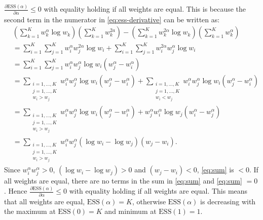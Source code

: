 \documentclass[a4paper]{article}
\DeclareMathOperator{\1}{{}\mathds{1}}
\begin{document}
$\frac{\partial \mathrm{ESS}(\alpha)}{\partial \alpha} \leq 0$ with equality holding if all weights are equal. 
This is because the second term in the numerator in \eqref{eq:ess-derivative} can be written as:
\begin{align}
    &\left(\sum_{k = 1}^K w_k^\alpha \log w_k \right) \left(\sum_{k = 1}^K w_k^{2a   } \right) - \left(\sum_{k = 1}^K w_k^{2 \alpha} \log w_k\right) \left(\sum_{k = 1}^K w_k^\alpha \right) \nonumber
    \\&= \sum_{i = 1}^K \sum_{j = 1}^K w_i^\alpha w_j^{2 \alpha} \log w_i + \sum_{i = 1}^K \sum_{j = 1}^K w_i^{2 \alpha} w_j^\alpha \log w_i \\
    &= \sum_{i = 1}^K \sum_{j = 1}^K w_i^\alpha w_j^\alpha \log w_i (w_j^\alpha - w_i^\alpha) \\
    &= \sum_{\substack{i = 1, \dotsc, K \\ j = 1, \dotsc, K \\ w_i > w_j}} w_i^\alpha w_j^\alpha \log w_i (w_j^\alpha - w_i^\alpha) + \sum_{\substack{i = 1, \dotsc, K \\ j = 1, \dotsc, K \\ w_i < w_j}} w_i^\alpha w_j^\alpha \log w_i (w_j^\alpha - w_i^\alpha) \\
    &= \sum_{\substack{i = 1, \dotsc, K \\ j = 1, \dotsc, K \\ w_i > w_j}} w_i^\alpha w_j^\alpha \log w_i (w_j^\alpha - w_i^\alpha) + w_j^\alpha w_i^\alpha \log w_j (w_i^\alpha - w_j^\alpha) \\
    &= \sum_{\substack{i = 1, \dotsc, K \\ j = 1, \dotsc, K \\ w_i > w_j}} w_i^\alpha w_j^\alpha (\log w_i - \log w_j) (w_j - w_i). \label{eq:sum}
\end{align}
Since $w_i^\alpha w_j^\alpha > 0$, $(\log w_i - \log w_j) > 0$ and $(w_j - w_i) < 0$, \eqref{eq:sum} is $< 0$.
If all weights are equal, there are no terms in the sum in \eqref{eq:sum} and \eqref{eq:sum} $= 0$.
Hence $\frac{\partial \mathrm{ESS}(\alpha)}{\partial \alpha} \leq 0$ with equality holding if all weights are equal.
This means that all weights are equal, $\mathrm{ESS}(\alpha) = K$, otherwise $\mathrm{ESS}(\alpha)$ is decreasing with the maximum at $\mathrm{ESS}(0) = K$ and minimum at $\mathrm{ESS}(1) = 1$.
\end{document}
